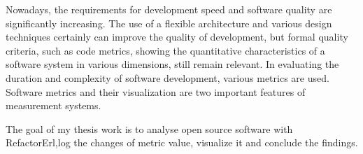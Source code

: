 Nowadays, the requirements for development speed and software quality are significantly increasing. The use of a flexible architecture and various design techniques certainly can improve the quality of development, but formal quality criteria, such as code metrics, showing the quantitative characteristics of a software system in various dimensions, still remain relevant. In evaluating the duration and complexity of software development, various metrics are used.
Software metrics and their visualization are two important features of   measurement systems. 

The  goal  of  my  thesis  work  is to  analyse  open  source  software  with  RefactorErl,log  the changes of metric value, visualize it and conclude the findings.
